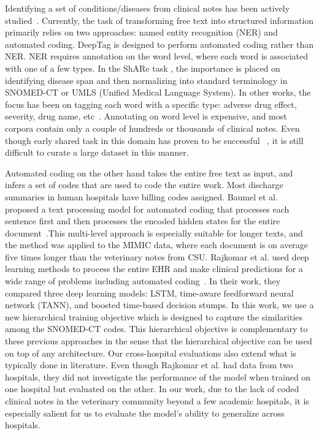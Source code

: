 \documentclass{article}[11pt,oneside]
\begin{document}
Identifying a set of conditions/diseases from clinical notes has been actively studied~\cite{demner2016aspiring,lipton2015learning}. Currently, the task of transforming free text into structured information primarily relies on two approaches: named entity recognition (NER) and automated coding. DeepTag is designed to perform automated coding rather than NER. NER requires annotation on the word level, where each word is associated with one of a few types. In the ShARe task \cite{pradhan2014evaluating}, the importance is placed on identifying disease span and then normalizing into standard terminology in SNOMED-CT or UMLS (Unified Medical Language System). In other works, the focus has been on tagging each word with a specific type: adverse drug effect, severity, drug name, etc~\cite{jagannatha2016bidirectional}. Annotating on word level is expensive, and most corpora contain only a couple of hundreds or thousands of clinical notes. Even though early shared task in this domain has proven to be successful  ~\cite{pradhan2014semeval,elhadad2015semeval}, it is still difficult to curate a large dataset in this manner.

Automated coding on the other hand takes the entire free text as input, and infers a set of codes that are used to code the entire work. Most discharge summaries in human hospitals have billing codes assigned. Baumel et al. proposed a text processing model for automated coding that processes each sentence first and then processes the encoded hidden states for the entire document~\cite{baumel2017multi}.This multi-level approach is especially suitable for longer texts, and the method was applied to the MIMIC data, where each document is on average five times longer than the veterinary notes from CSU. Rajkomar et al. used deep learning methods to process the entire EHR and make clinical predictions for a wide range of problems including automated coding~\cite{rajkomar2018scalable}. In their work, they compared three deep learning models: LSTM, time-aware feedforward neural network (TANN), and boosted time-based decision stumps. In this work, we use a new hierarchical training objective which is designed to capture the similarities among the SNOMED-CT codes. This hierarchical objective is complementary to these previous approaches in the sense that the hierarchical objective can be used on top of any architecture. Our cross-hospital evaluations also extend what is typically done in literature. Even though Rajkomar et al. had data from two hospitals, they did not investigate the performance of the model when trained on one hospital but evaluated on the other. In our work, due to the lack of coded clinical notes in the veterinary community beyond a few academic hospitals, it is especially salient for us to evaluate the model’s ability to generalize across hospitals.
\end{document}
